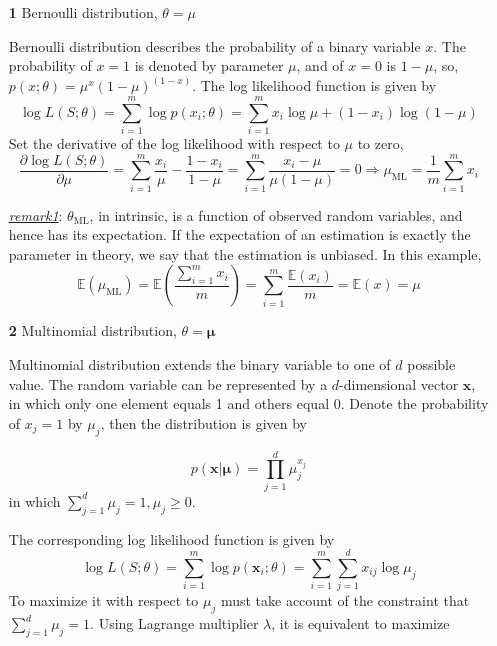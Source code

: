 \documentclass{article}
\begin{document}
	\begin{itemize}
	\item [\textbf{1}] Bernoulli distribution, $\theta={\mu}$
	
	Bernoulli distribution describes the probability of a binary variable $x$. The probability of $x=1$ is denoted by parameter $\mu$, and of $x=0$ is $1-\mu$, so, $p(x;\theta)=\mu^x(1-\mu)^{(1-x)}$. The log likelihood function is given by
	\begin{equation*}
	\log L(S;\theta) = \sum_{i=1}^m \log p(x_i;\theta) = \sum_{i=1}^m x_i\log \mu + (1-x_i)\log(1-\mu)
	\end{equation*}
Set the derivative of the log likelihood with respect to $\mu$ to zero,
	\begin{equation*}
	\frac{\partial \log L(S;\theta)}{\partial \mu} = \sum_{i=1}^m \frac{x_i}{\mu} - \frac{1-x_i}{1-\mu} = \sum_{i=1}^m \frac{x_i-\mu}{\mu(1-\mu)} = 0 \Longrightarrow	 \mu_{\mathrm{ML}}=\frac{1}{m}\sum_{i=1}^m x_i	
	\end{equation*}
	\begin{footnotesize}
	\textit{\underline{remark1}}: $\theta_{\mathrm{ML}}$, in intrinsic, is a function of observed random variables, and hence has its expectation. If the expectation of an estimation is exactly the parameter in theory, we say that the estimation is unbiased. In this example,
	\begin{equation*} 
	\mathbb{E} (\mu_\mathrm{ML}) = \mathbb{E} \left(\frac{\sum_{i=1}^m x_i}{m}\right) =  \sum_{i=1}^m  \frac{\mathbb{E}(x_i)}{m} = \mathbb{E}(x) = \mu
	\end{equation*}
	\end{footnotesize}
	
	\item [\textbf{2}] Multinomial distribution, $\theta=\bm{\mu}$
	
	Multinomial distribution extends the binary variable to one of $d$ possible value. The random variable can be represented by a $d$-dimensional vector $\bm{x}$, in which only one element equals 1 and others equal 0. Denote the probability of $x_j=1$ by $\mu_j$, then the distribution is given by
	
	\begin{equation*}
	p(\bm{x}|\bm{\mu}) = \prod_{j=1}^d \mu_j^{x_j}
	\end{equation*}
in which $\sum_{j=1}^d \mu_j=1, \mu_j\geq 0$.
		
	The corresponding log likelihood function is given by
	\begin{equation*}
	\log L(S;\theta) = \sum_{i=1}^m \log p(\bm{x}_i;\theta) = \sum_{i=1}^m \sum_{j=1}^d x_{ij} \log \mu_j
	\end{equation*}
To maximize it with respect to $\mu_j$ must take account of the constraint that $\sum_{j=1}^d \mu_j=1$. Using Lagrange multiplier $\lambda$, it is equivalent to maximize 
	

\end{itemize}
\end{document}
